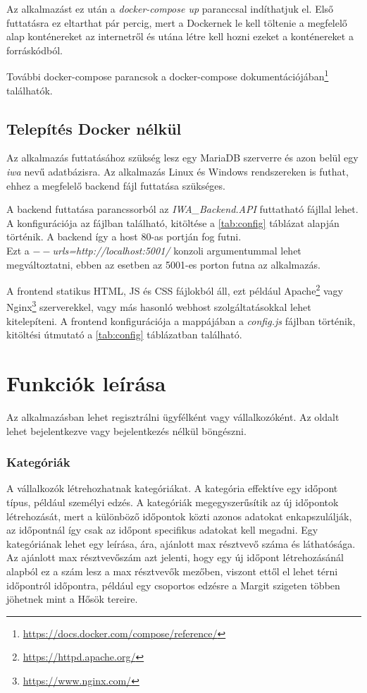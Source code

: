 Az alkalmazást ez után a \textit{docker-compose up} paranccsal indíthatjuk el. Első futtatásra ez eltarthat pár percig, mert a Dockernek le kell töltenie a megfelelő alap konténereket az internetről és utána létre kell hozni ezeket a konténereket a forráskódból.

További docker-compose parancsok a docker-compose dokumentációjában\footnote{\url{https://docs.docker.com/compose/reference/}} találhatók.

\subsection{Telepítés Docker nélkül}

Az alkalmazás futtatásához szükség lesz egy MariaDB szerverre és azon belül egy \textit{iwa} nevű adatbázisra. Az alkalmazás Linux és Windows rendszereken is futhat, ehhez a megfelelő backend fájl futtatása szükséges.

A backend futtatása parancssorból az \textit{IWA\_Backend.API} futtatható fájllal lehet. A konfigurációja az  fájlban található, kitöltése a \ref{tab:config} táblázat alapján történik. A backend így a host 80-as portján fog futni. \\ Ezt a \textit{$--$urls=http://localhost:5001/} konzoli argumentummal lehet megváltoztatni, ebben az esetben az 5001-es porton futna az alkalmazás.

A frontend statikus HTML, JS és CSS fájlokból áll, ezt például Apache\footnote{\url{https://httpd.apache.org/}} vagy Nginx\footnote{\url{https://www.nginx.com/}} szerverekkel, vagy más hasonló webhost szolgáltatásokkal lehet kitelepíteni. A frontend konfigurációja a mappájában a \textit{config.js} fájlban történik, kitöltési útmutató a \ref{tab:config} táblázatban található.

\section{Funkciók leírása}
\label{sec:functionDefinitions}

Az alkalmazásban lehet regisztrálni ügyfélként vagy vállalkozóként. Az oldalt lehet bejelentkezve vagy bejelentkezés nélkül böngészni.

\subsubsection{Kategóriák}

A vállalkozók létrehozhatnak kategóriákat. A kategória effektíve egy időpont típus, például személyi edzés. A kategóriák megegyszerűsítik az új időpontok létrehozását, mert a különböző időpontok közti azonos adatokat enkapszulálják, az időpontnál így csak az időpont specifikus adatokat kell megadni. Egy kategóriának lehet egy leírása, ára, ajánlott max résztvevő száma és láthatósága. Az ajánlott max résztvevőszám azt jelenti, hogy egy új időpont létrehozásánál alapból ez a szám lesz a max résztvevők mezőben, viszont ettől el lehet térni időpontról időpontra, például egy csoportos edzésre a Margit szigeten többen jöhetnek mint a Hősök tereire.


